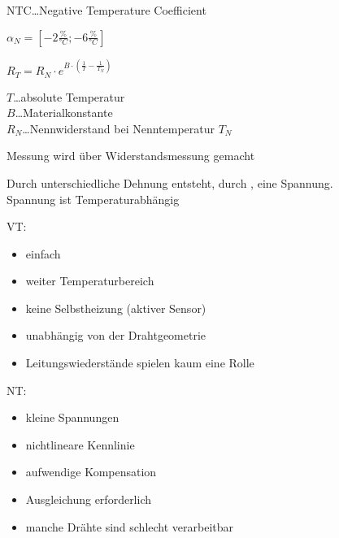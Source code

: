 \documentclass[letterpaper,10pt,english]{jupyterBook}
\begin{document}
\sphinxAtStartPar
NTC…Negative Temperature Coefficient

\sphinxAtStartPar
\(\alpha_N = \left[-2\frac{\%}{°C}; -6\frac{\%}{°C}\right]\)

\sphinxAtStartPar
\(R_T = R_N\cdot e^{B\cdot\left( \frac{1}{T} - \frac{1}{T_N} \right)}\)

\sphinxAtStartPar
\(T\)…absolute Temperatur\\
\(B\)…Materialkonstante\\
\(R_N\)…Nennwiderstand bei Nenntemperatur \(T_N\)

\sphinxAtStartPar
Messung wird über Widerstandsmessung gemacht

\begin{DUlineblock}{0em}
\item[] 
\end{DUlineblock}

\sphinxAtStartPar
Durch unterschiedliche Dehnung entsteht, durch , eine Spannung.\\
Spannung ist Temperaturabhängig

\sphinxAtStartPar
VT:
\begin{itemize}
\item {} 
\sphinxAtStartPar
einfach

\item {} 
\sphinxAtStartPar
weiter Temperaturbereich

\item {} 
\sphinxAtStartPar
keine Selbstheizung (aktiver Sensor)

\item {} 
\sphinxAtStartPar
unabhängig von der Drahtgeometrie

\item {} 
\sphinxAtStartPar
Leitungswiederstände spielen kaum eine Rolle

\end{itemize}

\sphinxAtStartPar
NT:
\begin{itemize}
\item {} 
\sphinxAtStartPar
kleine Spannungen

\item {} 
\sphinxAtStartPar
nichtlineare Kennlinie

\item {} 
\sphinxAtStartPar
aufwendige Kompensation

\item {} 
\sphinxAtStartPar
Ausgleichung erforderlich

\item {} 
\sphinxAtStartPar
manche Drähte sind schlecht verarbeitbar

\end{itemize}
\end{document}
